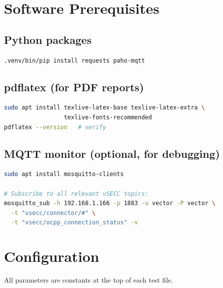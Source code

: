 \documentclass[11pt, a4paper]{article}
\begin{document}
\section{Software Prerequisites}

\subsection{Python packages}

\begin{lstlisting}[language=bash]
.venv/bin/pip install requests paho-mqtt
\end{lstlisting}

\subsection{pdflatex (for PDF reports)}

\begin{lstlisting}[language=bash]
sudo apt install texlive-latex-base texlive-latex-extra \
                 texlive-fonts-recommended
pdflatex --version   # verify
\end{lstlisting}

\subsection{MQTT monitor (optional, for debugging)}

\begin{lstlisting}[language=bash]
sudo apt install mosquitto-clients

# Subscribe to all relevant vSECC topics:
mosquitto_sub -h 192.168.1.166 -p 1883 -u vector -P vector \
  -t "vsecc/connector/#" \
  -t "vsecc/ocpp_connection_status" -v
\end{lstlisting}

\section{Configuration}

All parameters are constants at the top of each test file.
\end{document}
